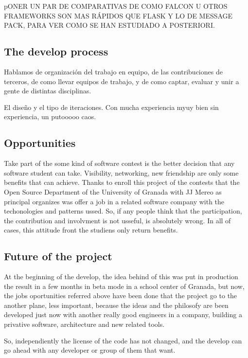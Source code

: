pONER UN PAR DE COMPARATIVAS DE COMO FALCON U OTROS FRAMEWORKS SON MAS RÁPIDOS
QUE FLASK Y LO DE MESSAGE PACK, PARA VER COMO SE HAN ESTUDIADO A POSTERIORI.

\subsection{The develop process}

Hablamos de organización del trabajo en equipo, de las contribuciones de terceros,
de como llevar equipos de trabajo, y de como captar, evaluar y unir a gente de
distintas disciplinas.

El diseño y el tipo de iteraciones. Con mucha experiencia myuy bien
sin experiencia, un putooooo caos.



\subsection{Opportunities}

Take part of the some kind of software contest is the better decision that any
software student can take. Visibility, networking, new friendship are only some
benefits that can achieve.
Thanks to enroll this project of the contests that the Open Source Department of
 the University of Granada with JJ Mereo as principal organizes was offer a job
 in a related software company with the techonologies and patterns ussed.
So, if any people think that the participation, the contribution and involvment
is not usseful, is absolutely wrong. In all of cases, this attitude front the
studiens only return benefits.

\subsection{Future of the project}

At the beginning of the develop, the idea behind of this was put in production
the result in a few months in beta mode in a school center of Granada, but now,
the jobs oportunities referred above have been done that the project go to the
another plane, less important, because the ideas and the philosofy are been
developed just now with another really good engineers in a company, building a
privative software, architecture and new related tools.

So, independiently the license of the code has not changed, and the develop can
 go ahead with any developer or group of them that want.

